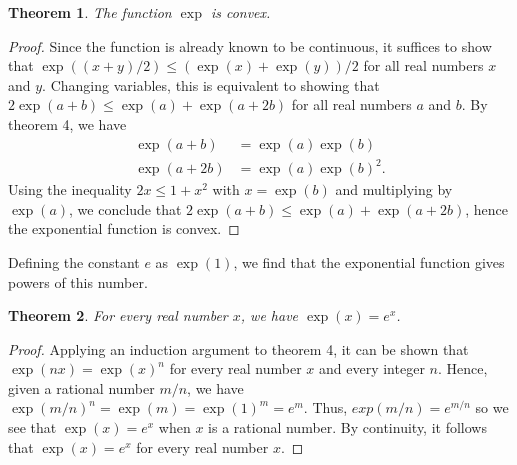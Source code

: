 \documentclass[12pt]{article}
\newtheorem{thm}{Theorem}
\begin{document}
\begin{thm}
The function $\exp$ is convex.
\end{thm}

\begin{proof}
Since the function is already known to be continuous, it suffices to show
that $\exp ((x + y)/2) \le (\exp(x) + \exp (y))/2$ for all real numbers $x$ 
and $y$.  Changing variables, this is equivalent to showing that $2 \exp
(a + b) \le \exp (a) + \exp (a + 2b)$ for all real numbers $a$ and $b$.
By theorem 4, we have
\begin{align}
 \exp (a + b) &= \exp (a) \exp (b) \\
 \exp (a + 2b) &= \exp (a) \exp (b)^2 .
\end{align}
Using the inequality $2x \le 1 + x^2$ with $x = \exp (b)$ and multiplying
by $\exp (a)$, we conclude that $2 \exp (a + b) \le \exp (a) + \exp (a + 2b)$,
hence the exponential function is convex.
\end{proof}

Defining the constant $e$ as $\exp (1)$, we find that the exponential
function gives powers of this number.

\begin{thm}
For every real number $x$, we have $\exp (x) = e^x$.
\end{thm}

\begin{proof}
Applying an induction argument to theorem 4, it can be shown that $\exp (nx) =
\exp(x)^n$ for every real number $x$ and every integer $n$.  Hence, given a
rational number $m/n$, we have $\exp (m/n)^n = \exp (m) = \exp(1)^m = e^m$.
Thus, $exp(m/n) = e^{m/n}$ so we see that $\exp (x) = e^x$ when $x$ is a
rational number.  By continuity, it follows that $\exp (x) = e^x$ for every
real number $x$.
\end{proof}
\end{document}
